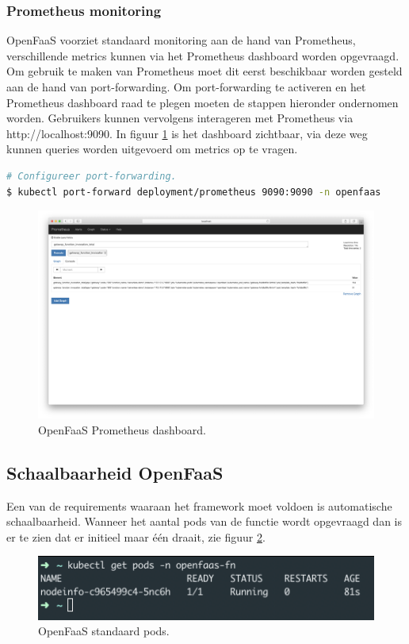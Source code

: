 \subsubsection{Prometheus monitoring}
OpenFaaS voorziet standaard monitoring aan de hand van Prometheus, verschillende metrics kunnen via het Prometheus dashboard worden opgevraagd. Om gebruik te maken van Prometheus moet dit eerst beschikbaar worden gesteld aan de hand van port-forwarding. Om port-forwarding te activeren en het Prometheus dashboard raad te plegen moeten de stappen hieronder ondernomen worden. Gebruikers kunnen  vervolgens interageren met Prometheus via http://localhost:9090. In figuur \ref{fig:openfaas-prometheus} is het dashboard zichtbaar, via deze weg kunnen queries worden uitgevoerd om metrics op te vragen.
\begin{lstlisting}[language=bash]
# Configureer port-forwarding.
$ kubectl port-forward deployment/prometheus 9090:9090 -n openfaas
\end{lstlisting}

\begin{figure}
    \includegraphics[width=1\textwidth]{img/openfaas-prometheus}
    \caption{OpenFaaS Prometheus dashboard.}
    \label{fig:openfaas-prometheus}  
\end{figure}

\subsection{Schaalbaarheid OpenFaaS}
Een van de requirements waaraan het framework moet voldoen is automatische schaalbaarheid. Wanneer het aantal pods van de functie wordt opgevraagd dan is er te zien dat er initieel maar één draait, zie figuur \ref{fig:openfaas-scalability-1}.
\begin{figure}
    \includegraphics[width=1\textwidth]{img/openfaas-scalability-1.png}
    \caption{OpenFaaS standaard pods.}
    \label{fig:openfaas-scalability-1}  
\end{figure}

